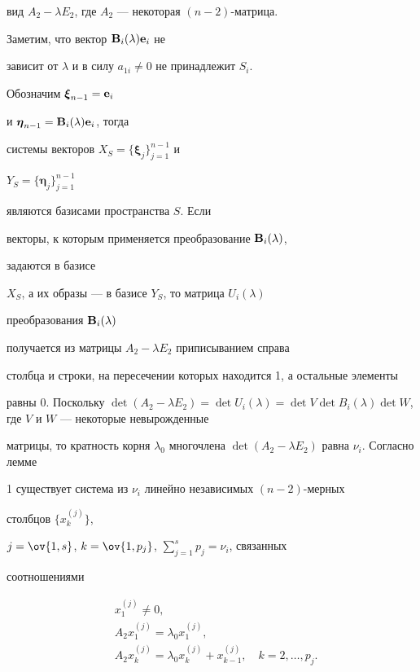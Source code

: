 \begin{pf}
вид $A_2-\lambda E_2$, где $A_2$ --- некоторая $(n-2)$-матрица. 


Заметим, что вектор $\bold B_i(\lambda)\bold e_i$ не 


зависит от $\lambda$ и в силу $a_{1i}\ne0$ не принадлежит $S_i$. 


Обозначим $\boldsymbol\xi_{n-1}=\bold e_i$


и $\boldsymbol\eta_{n-1}=\bold B_i(\lambda)\bold 


e_i$, тогда 


системы векторов $X_S=\{\boldsymbol\xi_j\}^{n-1}_{j=1}$ и 


$Y_S=\{\boldsymbol\eta_j\}^{n-1}_{j=1}$


являются базисами пространства $S$. Если 


векторы, к которым применяется преобразование $\bold B_i(\lambda)$, 


задаются в базисе 


$X_S$, а их образы --- в базисе $Y_S$, то матрица $U_i(\lambda)$ 


преобразования $\bold B_i(\lambda)$ 


получается из матрицы $A_2-\lambda E_2$ приписыванием справа


столбца и строки, на пересечении которых находится 1, а остальные элементы


равны 0. Поскольку $\det(A_2-\lambda E_2)=\det U_i(\lambda)=\det V\det 


B_i(\lambda)\det W$, где $V$ и $W$ --- некоторые невырожденные 


матрицы, то кратность корня $\lambda_0$ многочлена $\det(A_2-\lambda 


E_2)$ равна $\nu_i$. Согласно лемме 


1 существует система из $\nu_i$ линейно независимых $(n-2)$-мерных 


столбцов $\{x^{(j)}_k\}$, 


$j=\ov{1,s}$, $k=\ov{1,p_j}$, $\sum\limits^s_{j=1}p_j=\nu_i$, связанных 


соотношениями 


\begin{align*} 


& x^{(j)}_1\ne0,\\ 


& A_2x^{(j)}_1=\lambda_0x^{(j)}_1,\\ 


& A_2x^{(j)}_k=\lambda_0x^{(j)}_k+x^{(j)}_{k-1},\quad 


k=2,\dotsc,p_j. 



\end{align*}
\end{pf}
